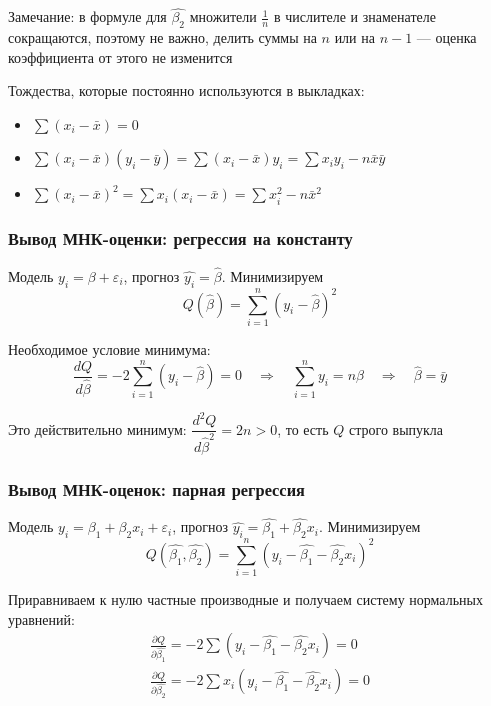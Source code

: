 \documentclass[12pt,a4paper]{article}
\numberwithin{equation}{section}
\theoremstyle{plain}
\theoremstyle{definition}
\theoremstyle{remark}
\begin{document}
Замечание: в формуле для $\hat{\beta_2}$ множители $\frac{1}{n}$ в числителе и знаменателе сокращаются, поэтому не важно, делить суммы на $n$ или на $n - 1$ — оценка коэффициента от этого не изменится

Тождества, которые постоянно используются в выкладках:

\begin{itemize}
    \item $\sum \left(x_i - \bar{x}\right) = 0$
    \item $\sum \left(x_i - \bar{x}\right)\left(y_i - \bar{y}\right) = \sum \left(x_i - \bar{x}\right) y_i = \sum x_i y_i - n \bar{x}\bar{y}$
    \item $\sum \left(x_i - \bar{x}\right)^2 = \sum x_i \left(x_i - \bar{x}\right) = \sum x_i^2 - n\bar{x}^2$
\end{itemize}

\subsubsection{Вывод МНК-оценки: регрессия на константу}

Модель $y_i = \beta + \varepsilon_i$, прогноз $\hat{y_i} = \hat{\beta}$. Минимизируем
$$
    Q\left(\hat{\beta}\right) = \sum_{i = 1}^n \left(y_i - \hat{\beta}\right)^2
$$

Необходимое условие минимума:
$$
    \frac{dQ}{d\hat{\beta}} = -2\sum_{i = 1}^n \left(y_i - \hat{\beta}\right) = 0
    \quad \Longrightarrow \quad
    \sum_{i = 1}^n y_i = n\hat{\beta}
    \quad \Longrightarrow \quad
    \hat{\beta} = \bar{y}
$$

Это действительно минимум: $\dfrac{d^2 Q}{d\hat{\beta}^2} = 2n > 0$, то есть $Q$ строго выпукла

\subsubsection{Вывод МНК-оценок: парная регрессия}

Модель $y_i = \beta_1 + \beta_2 x_i + \varepsilon_i$, прогноз $\hat{y_i} = \hat{\beta_1} + \hat{\beta_2} x_i$. Минимизируем
$$
    Q\left(\hat{\beta_1}, \hat{\beta_2}\right) = \sum_{i = 1}^n \left(y_i - \hat{\beta_1} - \hat{\beta_2} x_i\right)^2
$$

Приравниваем к нулю частные производные и получаем систему нормальных уравнений:
\begin{gather*}
    \frac{\partial Q}{\partial \hat{\beta_1}} = -2\sum \left(y_i - \hat{\beta_1} - \hat{\beta_2} x_i\right) = 0 \\
    \frac{\partial Q}{\partial \hat{\beta_2}} = -2\sum x_i \left(y_i - \hat{\beta_1} - \hat{\beta_2} x_i\right) = 0
\end{gather*}
\end{document}
